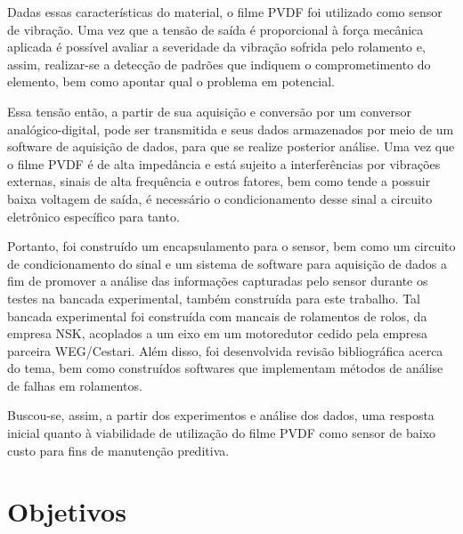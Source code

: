 \documentclass[
	12pt,				
	oneside,			
	a4paper,			
	english,			
	brazil,			
	]{abntex2ppgsi}
\begin{document}
Dadas essas características do material, o filme PVDF foi utilizado como sensor de vibração. Uma vez que a tensão de saída é proporcional à força mecânica aplicada é possível avaliar a severidade da vibração sofrida pelo rolamento e, assim, realizar-se a detecção de padrões que indiquem o comprometimento do elemento, bem como apontar qual o problema em potencial.


Essa tensão então, a partir de sua aquisição e conversão por um conversor analógico-digital, pode ser transmitida e seus dados armazenados por meio de um software de aquisição de dados, para que se realize posterior análise. Uma vez que o filme PVDF é de alta impedância e está sujeito a interferências por vibrações externas, sinais de alta frequência e outros fatores, bem como tende a possuir baixa voltagem de saída, é necessário o condicionamento desse sinal a circuito eletrônico específico para tanto. 

Portanto, foi construído um encapsulamento para o sensor, bem como um circuito de condicionamento do sinal e um sistema de software para aquisição de dados a fim de promover a análise das informações capturadas pelo sensor durante os testes na bancada experimental, também construída para este trabalho. Tal bancada experimental foi construída com mancais de rolamentos de rolos, da empresa NSK, acoplados a um eixo em um motoredutor cedido pela empresa parceira WEG/Cestari. Além disso, foi desenvolvida revisão bibliográfica acerca do tema, bem como construídos softwares que implementam métodos de análise de falhas em rolamentos. 

Buscou-se, assim, a partir dos experimentos e análise dos dados, uma resposta inicial quanto à viabilidade de utilização do filme PVDF como sensor de baixo custo para fins de manutenção preditiva.



\chapter{Objetivos}
\end{document}
